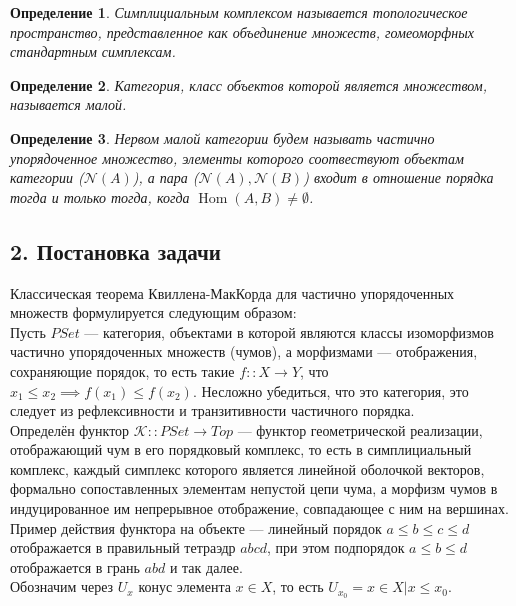 \documentclass[a4paper,12pt]{report}
\newtheorem{definition}{Определение}
\begin{document}
\begin{definition}
Симплициальным комплексом называется топологическое пространство, представленное как объединение множеств, гомеоморфных стандартным симплексам.
\end{definition}

\begin{itshape}
  \begin{definition}
  Категория, класс объектов которой является множеством, называется малой.
  \end{definition}

  \begin{definition}
  Нервом малой категории будем называть частично упорядоченное множество, элементы которого соотвествуют объектам категории ($\mathcal{N}(A)$), а пара ($\mathcal{N}(A),\mathcal{N}(B)$) входит в отношение порядка тогда и только тогда, когда $\operatorname{Hom}(A,B) \neq \emptyset$.
  \end{definition}
\end{itshape}

\subsection*{2. Постановка задачи}
Классическая теорема Квиллена-МакКорда для частично упорядоченных множеств формулируется следующим образом:\\

Пусть $PSet$ --- категория, объектами в которой являются классы изоморфизмов частично упорядоченных множеств (чумов), а морфизмами --- отображения, сохраняющие порядок, то есть такие $f :: X \to Y$, что $x_1 \leq x_2 \implies f(x_1) \leq f(x_2)$. Несложно убедиться, что это категория, это следует из рефлексивности и транзитивности частичного порядка.\\
Определён функтор $\mathcal{K} :: PSet \to Top$ --- функтор геометрической реализации, отображающий чум в его порядковый комплекс, то есть в симплициальный комплекс, каждый симплекс которого является линейной оболочкой векторов, формально сопоставленных элементам непустой цепи чума, а морфизм чумов в индуцированное им непрерывное отображение, совпадающее с ним на вершинах.\\
Пример действия функтора на объекте --- линейный порядок $a \leq b \leq c \leq d$ отображается в правильный тетраэдр $abcd$, при этом подпорядок $a \leq b \leq d$ отображается в грань $abd$ и так далее.\\
Обозначим через $U_x$ конус элемента $x \in X$, то есть $U_{x_0} = {x \in X | x \leq x_0}$.\\
\end{document}
